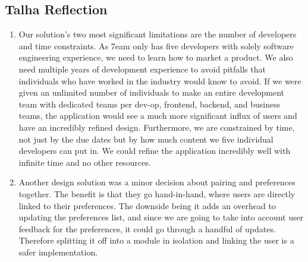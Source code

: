 \documentclass[12pt, titlepage]{article}
\begin{document}
\subsection{Talha Reflection}
\begin{enumerate}
	\item Our solution's two most significant limitations are the number of developers and time constraints. As 7eam only has five developers with solely software engineering experience, we need to learn how to market a product. We also need multiple years of development experience to avoid pitfalls that individuals who have worked in the industry would know to avoid. If we were given an unlimited number of individuals to make an entire development team with dedicated teams per dev-op, frontend, backend, and business teams, the application would see a much more significant influx of users and have an incredibly refined design. Furthermore, we are constrained by time, not just by the due dates but by how much content we five individual developers can put in. We could refine the application incredibly well with infinite time and no other resources.
	
	\item Another design solution was a minor decision about pairing and preferences together. The benefit is that they go hand-in-hand, where users are directly linked to their preferences. The downside being it adds an overhead to updating the preferences list, and since we are going to take into account user feedback for the preferences, it could go through a handful of updates. Therefore splitting it off into a module in isolation and linking the user is a safer implementation.
\end{enumerate}
\end{document}
